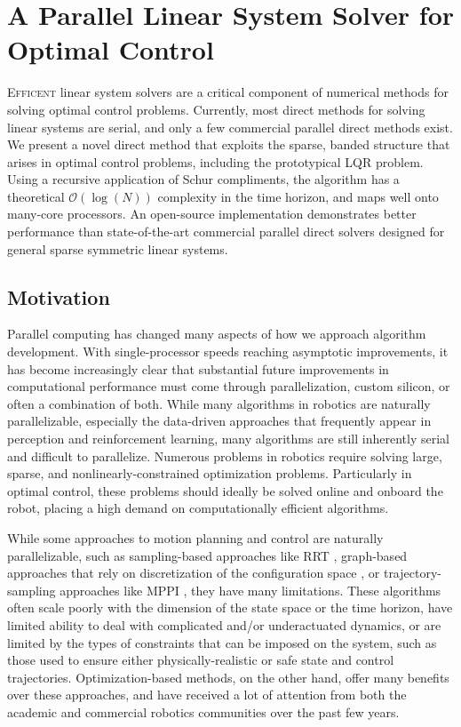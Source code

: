 \documentclass[../root.tex]{subfiles}
\newcommand{\0}{{\transparent{0} \resizebox{\mycellheight}{\mycellheight}{0}}}
\begin{document}
\chapter{A Parallel Linear System Solver for Optimal Control} \label{chap:rslqr}

\lettrine{E}{fficent} linear system solvers are a critical component of
numerical methods for solving optimal control problems.  Currently, most direct
methods for solving linear systems are serial, and only a few commercial
parallel direct methods exist.  We present a novel direct method that exploits
the sparse, banded structure that arises in optimal control problems, including
the prototypical LQR problem. Using a recursive application of Schur
compliments, the algorithm has a theoretical $\mathcal{O}(\log(N))$ complexity
in the time horizon, and maps well onto many-core processors. An open-source
implementation demonstrates better performance than state-of-the-art commercial
parallel direct solvers designed for general sparse symmetric linear systems.

\section{Motivation} Parallel computing has changed many aspects of how we approach
algorithm development.  With single-processor speeds reaching asymptotic improvements, it
has become increasingly clear that substantial future improvements in computational
performance must come through parallelization, custom silicon, or often a combination of
both. While many algorithms in robotics are naturally parallelizable, especially the
data-driven approaches that frequently appear in perception and reinforcement learning, many
algorithms are still inherently serial and difficult to parallelize.  Numerous problems in robotics require solving large, sparse, and
nonlinearly-constrained optimization problems. Particularly in optimal control, these problems should 
ideally be solved online and onboard the robot, placing a high demand on computationally
efficient algorithms.

While some approaches to motion planning and control are naturally parallelizable, such as
sampling-based approaches like RRT \cite{lavalle_Rapidlyexploring_2001}, graph-based approaches that
rely on discretization of the configuration space \cite{lavalle_Planning_2006}, or
trajectory-sampling approaches like MPPI \cite{williams_Aggressive_2016}, they have many 
limitations. These algorithms often scale poorly with the dimension of the state space or
the time horizon, have limited ability to deal with complicated and/or underactuated
dynamics, or are limited by the types of constraints that can be imposed on the system, such
as those used to ensure either physically-realistic or safe state and control trajectories.
Optimization-based methods, on the other hand, offer many benefits over these approaches, 
and have received a lot of attention from both the academic and commercial robotics
communities over the past few years.
\end{document}
